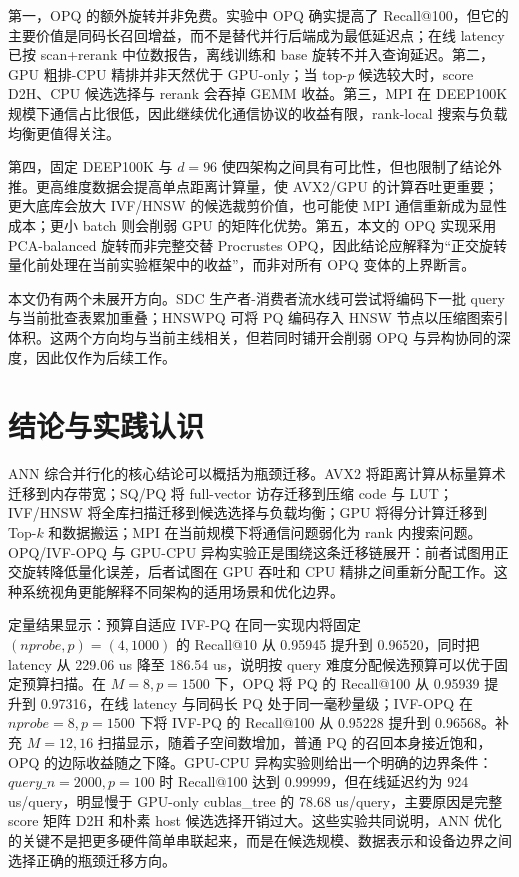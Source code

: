 \documentclass[a4paper,11pt,UTF8]{ctexart}
\begin{document}
第一，OPQ 的额外旋转并非免费。实验中 OPQ 确实提高了 Recall@100，但它的主要价值是同码长召回增益，而不是替代并行后端成为最低延迟点；在线 latency 已按 scan+rerank 中位数报告，离线训练和 base 旋转不并入查询延迟。第二，GPU 粗排-CPU 精排并非天然优于 GPU-only；当 top-$p$ 候选较大时，score D2H、CPU 候选选择与 rerank 会吞掉 GEMM 收益。第三，MPI 在 DEEP100K 规模下通信占比很低，因此继续优化通信协议的收益有限，rank-local 搜索与负载均衡更值得关注。

第四，固定 DEEP100K 与 $d=96$ 使四架构之间具有可比性，但也限制了结论外推。更高维度数据会提高单点距离计算量，使 AVX2/GPU 的计算吞吐更重要；更大底库会放大 IVF/HNSW 的候选裁剪价值，也可能使 MPI 通信重新成为显性成本；更小 batch 则会削弱 GPU 的矩阵化优势。第五，本文的 OPQ 实现采用 PCA-balanced 旋转而非完整交替 Procrustes OPQ，因此结论应解释为“正交旋转量化前处理在当前实验框架中的收益”，而非对所有 OPQ 变体的上界断言。

本文仍有两个未展开方向。SDC 生产者-消费者流水线可尝试将编码下一批 query 与当前批查表累加重叠；HNSWPQ 可将 PQ 编码存入 HNSW 节点以压缩图索引体积。这两个方向均与当前主线相关，但若同时铺开会削弱 OPQ 与异构协同的深度，因此仅作为后续工作。



\section{结论与实践认识}

ANN 综合并行化的核心结论可以概括为瓶颈迁移。AVX2 将距离计算从标量算术迁移到内存带宽；SQ/PQ 将 full-vector 访存迁移到压缩 code 与 LUT；IVF/HNSW 将全库扫描迁移到候选选择与负载均衡；GPU 将得分计算迁移到 Top-$k$ 和数据搬运；MPI 在当前规模下将通信问题弱化为 rank 内搜索问题。OPQ/IVF-OPQ 与 GPU-CPU 异构实验正是围绕这条迁移链展开：前者试图用正交旋转降低量化误差，后者试图在 GPU 吞吐和 CPU 精排之间重新分配工作。这种系统视角更能解释不同架构的适用场景和优化边界。

定量结果显示：预算自适应 IVF-PQ 在同一实现内将固定 $(nprobe,p)=(4,1000)$ 的 Recall@10 从 0.95945 提升到 0.96520，同时把 latency 从 229.06 us 降至 186.54 us，说明按 query 难度分配候选预算可以优于固定预算扫描。在 $M=8,p=1500$ 下，OPQ 将 PQ 的 Recall@100 从 0.95939 提升到 0.97316，在线 latency 与同码长 PQ 处于同一毫秒量级；IVF-OPQ 在 $nprobe=8,p=1500$ 下将 IVF-PQ 的 Recall@100 从 0.95228 提升到 0.96568。补充 $M=12,16$ 扫描显示，随着子空间数增加，普通 PQ 的召回本身接近饱和，OPQ 的边际收益随之下降。GPU-CPU 异构实验则给出一个明确的边界条件：$query\_n=2000,p=100$ 时 Recall@100 达到 0.99999，但在线延迟约为 924 us/query，明显慢于 GPU-only cublas\_tree 的 78.68 us/query，主要原因是完整 score 矩阵 D2H 和朴素 host 候选选择开销过大。这些实验共同说明，ANN 优化的关键不是把更多硬件简单串联起来，而是在候选规模、数据表示和设备边界之间选择正确的瓶颈迁移方向。
\end{document}
